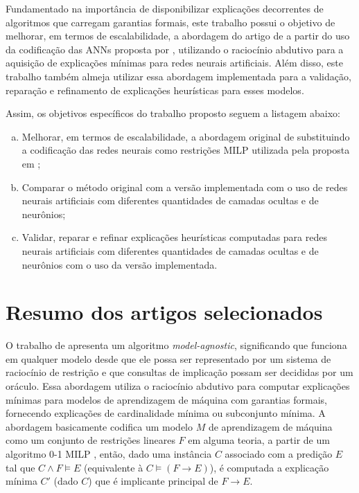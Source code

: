 Fundamentado na importância de disponibilizar explicações decorrentes de algoritmos que carregam garantias formais, este trabalho possui o objetivo de melhorar, em termos de escalabilidade, a abordagem do artigo de  a partir do uso da codificação das ANNs proposta por , utilizando o raciocínio abdutivo para a aquisição de explicações mínimas para redes neurais artificiais. Além disso, este trabalho também almeja utilizar essa abordagem implementada para a validação, reparação e refinamento de explicações heurísticas para esses modelos.


Assim, os objetivos específicos do trabalho proposto seguem a listagem abaixo:
\begin{enumerate}[a)]
    \item Melhorar, em termos de escalabilidade, a abordagem original de  substituindo a codificação das redes neurais como restrições MILP utilizada pela proposta em ;
    \item Comparar o método original com a versão implementada com o uso de redes neurais artificiais com diferentes quantidades de camadas ocultas e de neurônios;
    \item Validar, reparar e refinar explicações heurísticas computadas para redes neurais artificiais com diferentes quantidades de camadas ocultas e de neurônios com o uso da versão implementada.
\end{enumerate}

\section{Resumo dos artigos selecionados}

O trabalho de  apresenta um algoritmo \textit{model-agnostic}, significando que funciona em qualquer modelo desde que ele possa ser representado por um sistema de raciocínio de restrição e que consultas de implicação possam ser decididas por um oráculo. Essa abordagem utiliza o raciocínio abdutivo para computar explicações mínimas para modelos de aprendizagem de máquina com garantias formais, fornecendo explicações de cardinalidade mínima ou subconjunto mínima. A abordagem basicamente codifica um modelo $M$ de aprendizagem de máquina como um conjunto de restrições lineares $F$ em alguma teoria, a partir de um algoritmo 0-1 MILP \cite{milp_01}, então, dado uma instância $C$ associado com a predição $E$ tal que $C \wedge F \models E$ (equivalente à $C \models (F \rightarrow E)$), é computada a explicação mínima $C'$ (dado $C$) que é implicante principal de  $F \rightarrow E$. 

